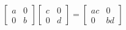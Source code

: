 \documentclass[preview]{standalone}
\begin{document}
\begin{align*}
\begin{bmatrix} a & 0 \\ 0 & b \end{bmatrix}\begin{bmatrix} c & 0 \\ 0 & d \end{bmatrix} = \begin{bmatrix} ac & 0 \\ 0 & bd \end{bmatrix}
\end{align*}
\end{document}
